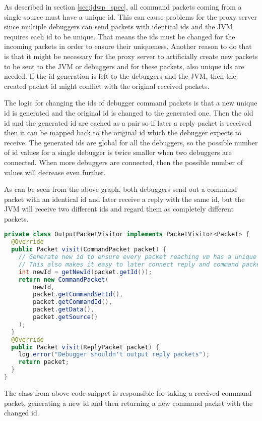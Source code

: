 \documentclass[..thesis.tex]{subfiles}
\begin{document}
As described in section \ref{sec:jdwp_spec}, all command packets coming from a single source must have a unique id.
This can cause problems for the proxy server since multiple debuggers can send packets with identical ids and the JVM requires each id to be unique.
That means the ids must be changed for the incoming packets in order to ensure their uniqueness.
Another reason to do that is that it might be necessary for the proxy server to artificially create new packets to be sent to the JVM or debuggers and for these packets, also unique ids are needed.
If the id generation is left to the debuggers and the JVM, then the created packet id might conflict with the original received packets.

The logic for changing the ids of debugger command packets is that a new unique id is generated and the original id is changed to the generated one.
Then the old id and the generated id are cached as a pair so if later a reply packet is received then it can be mapped back to the original id which the debugger expects to receive.
The generated ids are global for all the debuggers, so the possible number of id values for a single debugger is twice smaller when two debuggers are connected.
When more debuggers are connected, then the possible number of values will decrease even further.



As can be seen from the above graph, both debuggers send out a command packet with an identical id and later receive a reply with the same id, but the JVM will receive two different ids and regard them as completely different packets.

\begin{lstlisting}[language=java]
private class OutputPacketVisitor implements PacketVisitor<Packet> {
  @Override
  public Packet visit(CommandPacket packet) {
    // Generate new id to ensure every packet reaching vm has a unique id
    // This also makes it easy to later connect reply and command packets and avoid collision
    int newId = getNewId(packet.getId());
    return new CommandPacket(
        newId,
        packet.getCommandSetId(),
        packet.getCommandId(),
        packet.getData(),
        packet.getSource()
    );
  }
  @Override
  public Packet visit(ReplyPacket packet) {
    log.error("Debugger shouldn't output reply packets");
    return packet;
  }
}
\end{lstlisting}

The class  from above code snippet is responsible for taking a received command packet, generating a new id and then returning a new command packet with the changed id.
\end{document}
